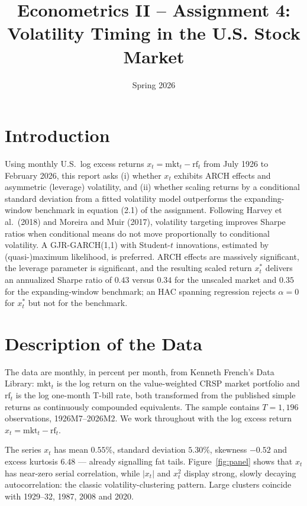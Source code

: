 \documentclass[12pt]{article}
\title{Econometrics II -- Assignment 4:\\
Volatility Timing in the U.S. Stock Market}
\date{Spring 2026}
\begin{document}
\maketitle
\section{Introduction}

Using monthly U.S.\ log excess returns $x_t=\text{mkt}_t-\text{rf}_t$ from July 1926 to February 2026, this report asks (i) whether $x_t$ exhibits ARCH effects and asymmetric (leverage) volatility, and (ii) whether scaling returns by a conditional standard deviation from a fitted volatility model outperforms the expanding-window benchmark in equation (2.1) of the assignment. Following Harvey et al.\ (2018) and Moreira and Muir (2017), volatility targeting improves Sharpe ratios when conditional means do not move proportionally to conditional volatility. A GJR-GARCH(1,1) with Student-$t$ innovations, estimated by (quasi-)maximum likelihood, is preferred. ARCH effects are massively significant, the leverage parameter is significant, and the resulting scaled return $x^*_t$ delivers an annualized Sharpe ratio of $0.43$ versus $0.34$ for the unscaled market and $0.35$ for the expanding-window benchmark; an HAC spanning regression rejects $\alpha=0$ for $x^*_t$ but not for the benchmark.

\section{Description of the Data}

The data are monthly, in percent per month, from Kenneth French's Data Library: $\text{mkt}_t$ is the log return on the value-weighted CRSP market portfolio and $\text{rf}_t$ is the log one-month T-bill rate, both transformed from the published simple returns as continuously compounded equivalents. The sample contains $T=1{,}196$ observations, 1926M7--2026M2. We work throughout with the log excess return $x_t=\text{mkt}_t-\text{rf}_t$.

The series $x_t$ has mean $0.55\%$, standard deviation $5.30\%$, skewness $-0.52$ and excess kurtosis $6.48$ — already signalling fat tails. Figure~\ref{fig:panel} shows that $x_t$ has near-zero serial correlation, while $|x_t|$ and $x_t^2$ display strong, slowly decaying autocorrelation: the classic volatility-clustering pattern. Large clusters coincide with 1929--32, 1987, 2008 and 2020.
\end{document}
